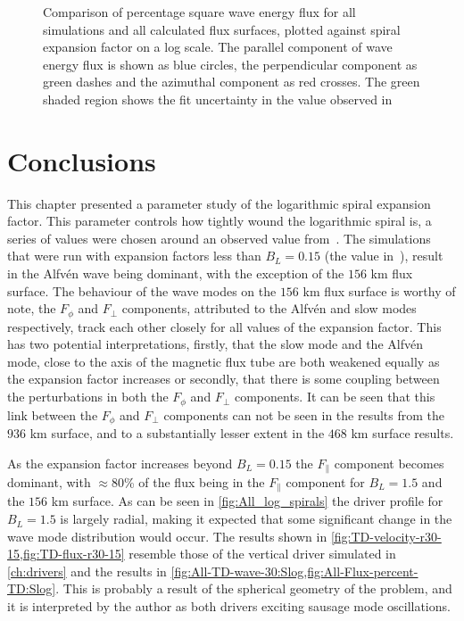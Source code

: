 \documentclass[a4paper,12pt,fourier,authoryear,custommargin]{Classes/PhDThesisPSnPDF}
\begin{document}
\begin{figure}[h]
    \centering
    \caption{Comparison of percentage square wave energy flux for all simulations and all calculated flux surfaces, plotted against spiral expansion factor on a log scale. The parallel component of wave energy flux is shown as blue circles, the perpendicular component as green dashes and the azimuthal component as red crosses. The green shaded region shows the fit uncertainty in the value observed in~\citet{bonet2008}}
    \label{fig:expfac-flux-comparison}
\end{figure}

\section{Conclusions}

This chapter presented a parameter study of the logarithmic spiral expansion factor.
This parameter controls how tightly wound the logarithmic spiral is, a series of values were chosen around an observed value from~\cite{bonet2008}.
The simulations that were run with expansion factors less than $B_L=0.15$ (the value in~\cite{bonet2008}), result in the Alfv\'en wave being dominant, with the exception of the $156$ km flux surface.
The behaviour of the wave modes on the $156$ km flux surface is worthy of note, the $F_\phi$ and $F_\perp$ components, attributed to the Alfv\'en and slow modes respectively, track each other closely for all values of the expansion factor.
This has two potential interpretations, firstly, that the slow mode and the Alfv\'en mode, close to the axis of the magnetic flux tube are both weakened equally as the expansion factor increases or secondly, that there is some coupling between the perturbations in both the $F_\phi$ and $F_\perp$ components.
It can be seen that this link between the $F_\phi$ and $F_\perp$ components can not be seen in the results from the $936$ km surface, and to a substantially lesser extent in the $468$ km surface results.

As the expansion factor increases beyond $B_L=0.15$ the $F_\parallel$ component becomes dominant, with $\approx 80$\% of the flux being in the $F_\parallel$ component for $B_L=1.5$ and the $156$ km surface.
As can be seen in \cref{fig:All_log_spirals} the driver profile for $B_L=1.5$ is largely radial, making it expected that some significant change in the wave mode distribution would occur.
The results shown in \cref{fig:TD-velocity-r30-15,fig:TD-flux-r30-15} resemble those of the vertical driver simulated in \cref{ch:drivers} and the results in \cref{fig:All-TD-wave-30:Slog,fig:All-Flux-percent-TD:Slog}.
This is probably a result of the spherical geometry of the problem, and it is interpreted by the author as both drivers exciting sausage mode oscillations.
\end{document}
